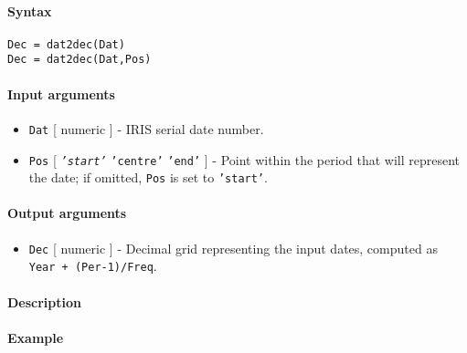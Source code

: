 


	\paragraph{Syntax}

\begin{verbatim}
Dec = dat2dec(Dat)
Dec = dat2dec(Dat,Pos)
\end{verbatim}

\paragraph{Input arguments}

\begin{itemize}
\item
  \texttt{Dat} {[} numeric {]} - IRIS serial date number.
\item
  \texttt{Pos} {[} \emph{\texttt{'start'}} \textbar{} \texttt{'centre'}
  \textbar{} \texttt{'end'} {]} - Point within the period that will
  represent the date; if omitted, \texttt{Pos} is set to
  \texttt{'start'}.
\end{itemize}

\paragraph{Output arguments}

\begin{itemize}
\itemsep1pt\parskip0pt
\item
  \texttt{Dec} {[} numeric {]} - Decimal grid representing the input
  dates, computed as \texttt{Year + (Per-1)/Freq}.
\end{itemize}

\paragraph{Description}

\paragraph{Example}


